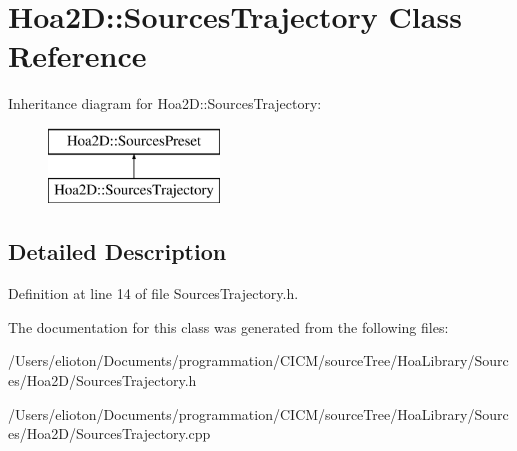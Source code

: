 \hypertarget{class_hoa2_d_1_1_sources_trajectory}{\section{Hoa2\-D\-:\-:Sources\-Trajectory Class Reference}
\label{class_hoa2_d_1_1_sources_trajectory}
}
Inheritance diagram for Hoa2\-D\-:\-:Sources\-Trajectory\-:\begin{figure}[H]
\begin{center}
\leavevmode
\includegraphics[height=2.000000cm]{class_hoa2_d_1_1_sources_trajectory}
\end{center}
\end{figure}


\subsection{Detailed Description}


Definition at line 14 of file Sources\-Trajectory.\-h.



The documentation for this class was generated from the following files\-:\begin{DoxyCompactItemize}
\item 
/\-Users/elioton/\-Documents/programmation/\-C\-I\-C\-M/source\-Tree/\-Hoa\-Library/\-Sources/\-Hoa2\-D/Sources\-Trajectory.\-h\item 
/\-Users/elioton/\-Documents/programmation/\-C\-I\-C\-M/source\-Tree/\-Hoa\-Library/\-Sources/\-Hoa2\-D/Sources\-Trajectory.\-cpp\end{DoxyCompactItemize}

